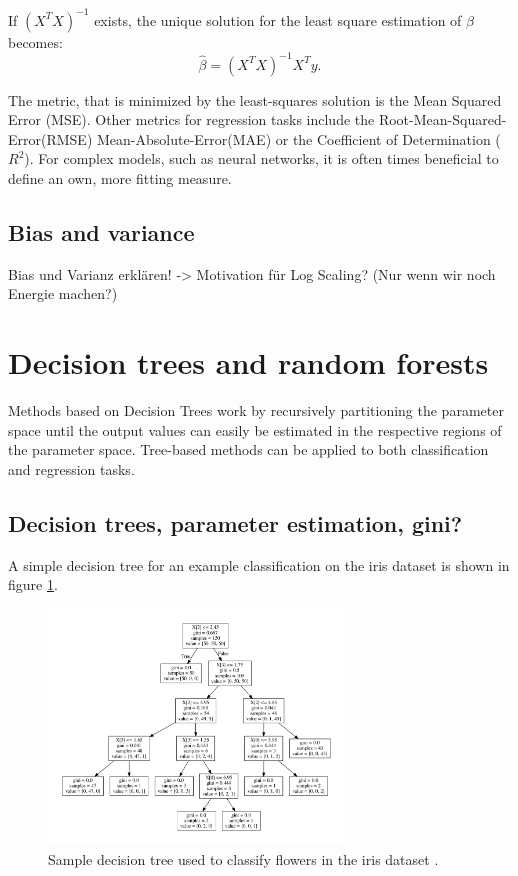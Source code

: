 If $(X^TX)^{-1}$ exists, the unique solution for the 
least square estimation of $\beta$ becomes:
\begin{equation}
	\hat{\beta} = (X^TX)^{-1}X^T y.
\end{equation}

The metric, that is minimized by the least-squares solution
is the Mean Squared Error (MSE).
Other metrics for regression tasks include the
Root-Mean-Squared-Error(RMSE)
Mean-Absolute-Error(MAE)
or the Coefficient of Determination ($R^2$).
For complex models, such as neural networks, it is often times 
beneficial to define an own, more fitting measure.

\subsection{Bias and variance}
Bias und Varianz erklären!
-> Motivation für Log Scaling? (Nur wenn wir noch Energie machen?)

\section{Decision trees and random forests}
Methods based on Decision Trees work by recursively partitioning
the parameter space until the output values can easily be estimated
in the respective regions of the parameter space.
Tree-based methods can be applied to both classification and regression tasks.

\subsection{Decision trees, parameter estimation, gini?}
A simple decision tree
for an example classification on the iris dataset
is shown in figure \ref{fig:03_tree}.

\begin{figure}
  \centering
  \includegraphics[width=0.7\textwidth]{Plots/decision_tree.pdf}
  \caption{Sample decision tree used to classify flowers in
  the iris dataset \cite{fisher1936use} \cite{sklearn}.}
  \label{fig:03_tree}
\end{figure}

